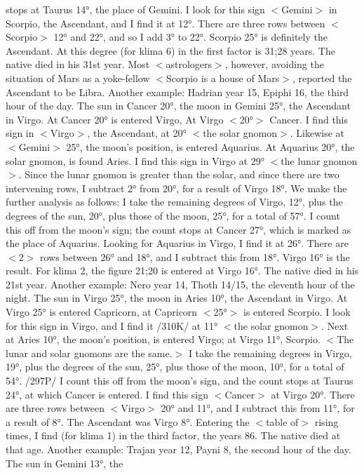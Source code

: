 stops at Taurus 14°, the place of Gemini. I look for this sign $<$Gemini$>$ in Scorpio, the Ascendant, and I
find it at 12°. There are three rows between $<$Scorpio$>$ 12° and 22°, and so I add 3° to 22°. Scorpio 25°
is definitely the Ascendant. At this degree (for klima 6) in the first factor is 31;28 years. The native died
in his 31st year. Most $<$astrologers$>$, however, avoiding the situation of Mars as a yoke-fellow $<$Scorpio
is a house of Mars$>$, reported the Ascendant to be Libra.
Another example: Hadrian year 15, Epiphi 16, the third hour of the day. The sun in Cancer 20°, the
moon in Gemini 25°, the Ascendant in Virgo. At Cancer 20° is entered Virgo, At Virgo $<$20°$>$ Cancer. I
find this sign in $<$Virgo$>$, the Ascendant, at 20° $<$the solar gnomon$>$. Likewise at $<$Gemini$>$ 25°, the
moon’s position, is entered Aquarius. At Aquarius 20°, the solar gnomon, is found Aries. I find this sign
in Virgo at 29° $<$the lunar gnomon$>$. Since the lunar gnomon is greater than the solar, and since there are
two intervening rows, I subtract 2° from 20°, for a result of Virgo 18°. We make the further analysis as
follows: I take the remaining degrees of Virgo, 12°, plus the degrees of the sun, 20°, plus those of the
moon, 25°, for a total of 57°. I count this off from the moon’s sign; the count stops at Cancer 27°, which
is marked as the place of Aquarius. Looking for Aquarius in Virgo, I find it at 26°. There are $<$2$>$ rows
between 26° and 18°, and I subtract this from 18°. Virgo 16° is the result. For klima 2, the figure 21;20
is entered at Virgo 16°. The native died in his 21st year.
Another example: Nero year 14, Thoth 14/15, the eleventh hour of the night. The sun in Virgo 25°,
the moon in Aries 10°, the Ascendant in Virgo. At Virgo 25° is entered Capricorn, at Capricorn $<$25°$>$ is
entered Scorpio. I look for this sign in Virgo, and I find it /310K/ at 11° $<$the solar gnomon$>$. Next at
Aries 10°, the moon’s position, is entered Virgo; at Virgo 11°, Scorpio. $<$The lunar and solar gnomons
are the same.$>$ I take the remaining degrees in Virgo, 19°, plus the degrees of the sun, 25°, plus those of
the moon, 10°, for a total of 54°. /297P/ I count this off from the moon’s sign, and the count stops at
Taurus 24°, at which Cancer is entered. I find this sign $<$Cancer$>$ at Virgo 20°. There are three rows
between $<$Virgo$>$ 20° and 11°, and I subtract this from 11°, for a result of 8°. The Ascendant was Virgo
8°. Entering the $<$table of$>$ rising times, I find (for klima 1) in the third factor, the years 86. The native
died at that age.
Another example: Trajan year 12, Payni 8, the second hour of the day. The sun in Gemini 13°, the
